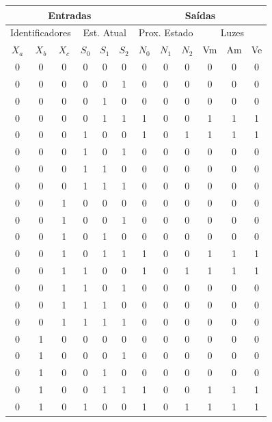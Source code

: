 \documentclass[12pt,a4paper]{article}
\begin{document}

\begin{longtable}{|ccc|ccc||ccc|c|c|c|}
\hline
\multicolumn{6}{|c|}{\textbf{Entradas}} & \multicolumn{6}{|c|}{\textbf{Saídas}} \\ \hline
\multicolumn{3}{|c|}{Identificadores} & \multicolumn{3}{|c|}{Est. Atual} & \multicolumn{3}{|c|}{Prox. Estado} & \multicolumn{3}{|c|}{Luzes} \\ \hline
$X_a$ & $X_b$ & $X_c$ & $S_0$ & $S_1$ & $S_2$ & $N_0$ & $N_1$ & $N_2$ & Vm & Am & Ve \\ \hline \endhead
0 & 0 & 0 & 0 & 0 & 0 & 0 & 0 & 0 & 0 & 0 & 0 \\ \hline
0 & 0 & 0 & 0 & 0 & 1 & 0 & 0 & 0 & 0 & 0 & 0 \\ \hline
0 & 0 & 0 & 0 & 1 & 0 & 0 & 0 & 0 & 0 & 0 & 0 \\ \hline
0 & 0 & 0 & 0 & 1 & 1 & 1 & 0 & 0 & 1 & 1 & 1 \\ \hline
0 & 0 & 0 & 1 & 0 & 0 & 1 & 0 & 1 & 1 & 1 & 1 \\ \hline
0 & 0 & 0 & 1 & 0 & 1 & 0 & 0 & 0 & 0 & 0 & 0 \\ \hline
0 & 0 & 0 & 1 & 1 & 0 & 0 & 0 & 0 & 0 & 0 & 0 \\ \hline
0 & 0 & 0 & 1 & 1 & 1 & 0 & 0 & 0 & 0 & 0 & 0 \\ \hline
0 & 0 & 1 & 0 & 0 & 0 & 0 & 0 & 0 & 0 & 0 & 0 \\ \hline
0 & 0 & 1 & 0 & 0 & 1 & 0 & 0 & 0 & 0 & 0 & 0 \\ \hline
0 & 0 & 1 & 0 & 1 & 0 & 0 & 0 & 0 & 0 & 0 & 0 \\ \hline
0 & 0 & 1 & 0 & 1 & 1 & 1 & 0 & 0 & 1 & 1 & 1 \\ \hline
0 & 0 & 1 & 1 & 0 & 0 & 1 & 0 & 1 & 1 & 1 & 1 \\ \hline
0 & 0 & 1 & 1 & 0 & 1 & 0 & 0 & 0 & 0 & 0 & 0 \\ \hline
0 & 0 & 1 & 1 & 1 & 0 & 0 & 0 & 0 & 0 & 0 & 0 \\ \hline
0 & 0 & 1 & 1 & 1 & 1 & 0 & 0 & 0 & 0 & 0 & 0 \\ \hline
0 & 1 & 0 & 0 & 0 & 0 & 0 & 0 & 0 & 0 & 0 & 0 \\ \hline
0 & 1 & 0 & 0 & 0 & 1 & 0 & 0 & 0 & 0 & 0 & 0 \\ \hline
0 & 1 & 0 & 0 & 1 & 0 & 0 & 0 & 0 & 0 & 0 & 0 \\ \hline
0 & 1 & 0 & 0 & 1 & 1 & 1 & 0 & 0 & 1 & 1 & 1 \\ \hline
0 & 1 & 0 & 1 & 0 & 0 & 1 & 0 & 1 & 1 & 1 & 1 \\ \hline

\end{longtable}
\end{document}

